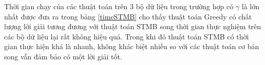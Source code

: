 Thời gian chạy của các thuật toán trên 3 bộ dữ liệu trong trường hợp có $\gamma$ là lớn nhất được đưa ra trong bảng \ref{timeSTMB} cho thấy thuật toán Greedy có chất lượng lời giải tương đương với thuật toán STMB song thời gian thực nghiệm trên các bộ dữ liệu lại rất không hiệu quả. Trong khi đó thuật toán STMB có thời gian thực hiện khá là nhanh, không khác biệt nhiều so với các thuật toán cơ bản song vẫn đảm bảo có một lời giải tốt.